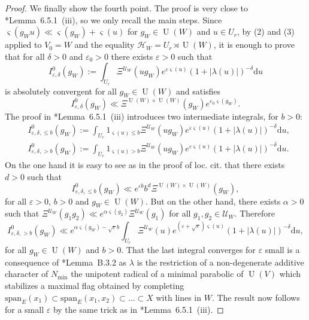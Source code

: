 \documentclass[letterpaper,11pt]{amsart}
\newcommand{\cH}{\mathcal{H}}
\newcommand{\cU}{\mathcal{U}}
\newcommand{\rd}{\mathrm{d}}
\newcommand{\<}{\negthickspace}
\newcommand{\valP}[1]{\left|#1\right|}
\DeclareMathOperator{\U}{U}
\theoremstyle{definition}
\theoremstyle{plain}
\theoremstyle{remark}
\numberwithin{equation}{section}
\begin{document}
\begin{proof}
We finally show the fourth point. The proof is very close to \cite{BP2}*{Lemma~6.5.1~(iii)}, so we only recall the main steps. Since $\varsigma(g_W u ) \ll \varsigma(g_W)+ \varsigma(u)$ for $g_W \in \U(W)$ and $u \in U_r$, by (2) and (3) applied to $V_0=W$ and the equality $\cH_W=U_r \rtimes \U(W)$, it is enough to prove that for all $\delta>0$ and $\varepsilon_0>0$ there exists $\varepsilon>0$ such that 
\begin{equation*}
    I^0_{\varepsilon, \delta}(g_W):= \int_{U_r} \Xi^{\cU_W}(u g_W) e^{\varepsilon \varsigma(u)} (1+\valP{\lambda(u)})^{-\delta} \rd u
\end{equation*}
is absolutely convergent for all $g_W \in \U(W)$ and satisfies
\begin{equation*}
    I^0_{\varepsilon, \delta}(g_W) \ll \Xi^{\U(W) \times \U(W)}(g_W) e^{\varepsilon_0 \varsigma(g_W)}.
\end{equation*}
The proof in \cite{BP2}*{Lemma~6.5.1~(iii)} introduces two intermediate integrals, for $b>0$:
\begin{align*}
       &I^0_{\varepsilon, \delta, \leq b}(g_W):=\int_{U_r}  1_{\varsigma(u) \leq b} \Xi^{\cU_W}(ug_W) e^{\varepsilon \varsigma(u)} (1+\valP{\lambda(u)})^{-\delta}\rd u, \\
     &I^0_{\varepsilon, \delta, >b}(g_W):=\int_{U_r}  1_{\varsigma(u) > b} \Xi^{\cU_W}(u g_W) e^{\varepsilon \varsigma(u)} (1+\valP{\lambda(u)})^{-\delta}\rd u.
\end{align*}
On the one hand it is easy to see as in the proof of loc. cit. that there exists $d>0$ such that 
\begin{equation}
\label{eq:compact_estimate}
    I^0_{\varepsilon, \delta, \leq b}(g_W) \ll e^{\varepsilon b} b^d \Xi^{\U(W) \times \U(W)}(g_W),
\end{equation}
for all $\varepsilon >0$, $b>0$ and $g_W \in \U(W)$. But on the other hand, there exists $\alpha >0$ such that $\Xi^{\cU_W}(g_1 g_2) \ll e^{\alpha \varsigma(g_2)} \Xi^{\cU_W}(g_1)$ for all $g_1, g_2 \in \cU_W$. Therefore
\begin{equation}
\label{eq:non_compact_estimate}
     I^0_{\varepsilon, \delta, > b}(g_W) \ll e^{\alpha \varsigma(g_W) - \sqrt{\varepsilon}b} \int_{U_r} \Xi^{\cU_W}(u) e^{(\varepsilon + \sqrt{\varepsilon}) \varsigma(u)} (1+\valP{\lambda(u)})^{-\delta}\rd u,
\end{equation}
for all $g_W \in \U(W)$ and $b>0$. That the last integral converges for $\varepsilon$ small is a consequence of \cite{BP2}*{Lemma~B.3.2} as $\lambda$ is the restriction of a non-degenerate additive character of $N_{\mathrm{min}}$ the unipotent radical of a minimal parabolic of $\U(V)$ which stabilizes a maximal flag obtained by completing $\mathrm{span}_E(x_1) \subset \mathrm{span}_E(x_1,x_2) \subset \hdots \subset X$ with lines in $W$. The result now follows for a small $\varepsilon$ by the same trick as in \cite{BP2}*{Lemma~6.5.1~(iii)}.
\end{proof}
\end{document}
